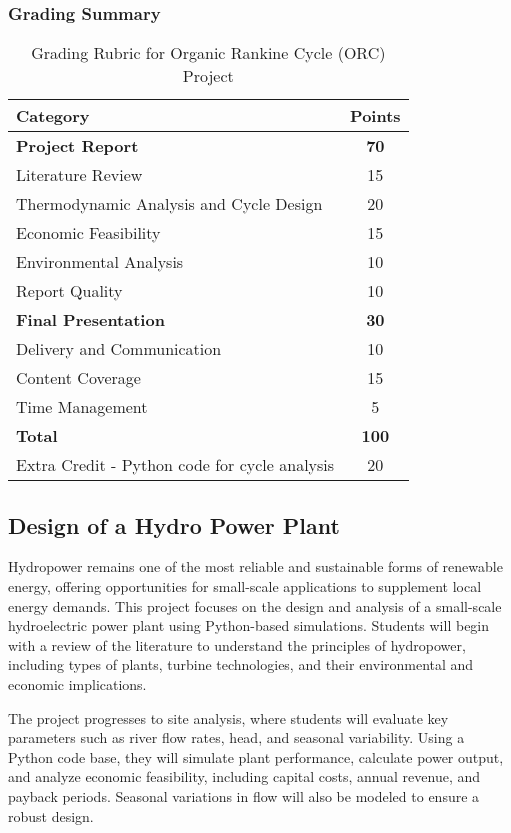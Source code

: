 \documentclass[11pt]{article}
\begin{document}
\subsubsection*{Grading Summary}
\begin{table}[h!]
    \centering
    \begin{tabular}{|l|c|}
        \hline
        \textbf{Category} & \textbf{Points} \\
        \hline
        \textbf{Project Report} & \textbf{70} \\
        Literature Review & 15 \\
        Thermodynamic Analysis and Cycle Design & 20 \\
        Economic Feasibility & 15 \\
        Environmental Analysis & 10 \\
        Report Quality & 10 \\
        \hline
        \textbf{Final Presentation} & \textbf{30} \\
        Delivery and Communication & 10 \\
        Content Coverage & 15 \\
        Time Management & 5 \\
        \hline
        \textbf{Total} & \textbf{100} \\
        \hline
        Extra Credit - Python code for cycle analysis&20\\
        \hline
    \end{tabular}
    \caption{Grading Rubric for Organic Rankine Cycle (ORC) Project}
\end{table}
\newpage
\subsection{ Design of a Hydro Power Plant}

Hydropower remains one of the most reliable and sustainable forms of renewable energy, offering opportunities for small-scale applications to supplement local energy demands. This project focuses on the design and analysis of a small-scale hydroelectric power plant using Python-based simulations. Students will begin with a review of the literature to understand the principles of hydropower, including types of plants, turbine technologies, and their environmental and economic implications.

The project progresses to site analysis, where students will evaluate key parameters such as river flow rates, head, and seasonal variability. Using a Python code base, they will simulate plant performance, calculate power output, and analyze economic feasibility, including capital costs, annual revenue, and payback periods. Seasonal variations in flow will also be modeled to ensure a robust design.
\end{document}
